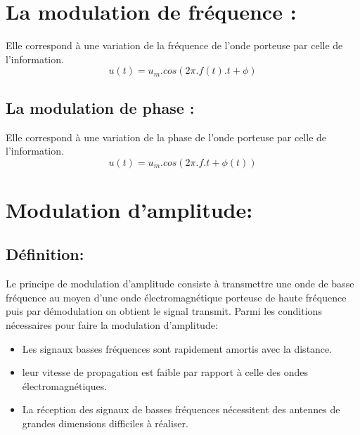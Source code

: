 \documentclass[12pt]{article}
\begin{document}
\section*{La modulation de fréquence :}
Elle correspond à une variation de la fréquence de l'onde porteuse par celle de l'information.$$u(t) = u_m.cos(2\pi.f(t).t + \phi)$$
\begin{center}
\end{center}

\subsection*{La modulation de phase :}
Elle correspond à une variation de la phase de l'onde porteuse par celle de l'information.
$$u(t) = u_m.cos(2\pi.f.t + \phi(t))$$

\section{Modulation d'amplitude:}

\subsection{Définition: }
Le principe de modulation d'amplitude consiste à transmettre une onde de basse fréquence au moyen d'une onde électromagnétique porteuse
de haute fréquence puis par démodulation on obtient le signal transmit.
Parmi les conditions nécessaires pour faire la modulation d'amplitude:
\begin{itemize}
	\item Les signaux basses fréquences sont rapidement amortis avec la distance.
	\item leur vitesse de propagation est faible par rapport à celle des ondes électromagnétiques.
	\item La réception des signaux de basses fréquences nécessitent des antennes de grandes dimensions difficiles à réaliser.
\end{itemize}
\end{document}
